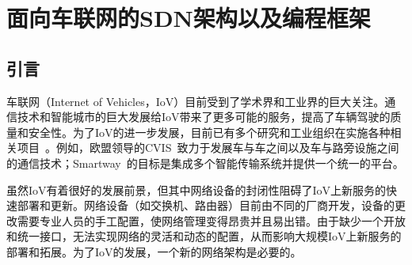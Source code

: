 \chapter{面向车联网的SDN架构以及编程框架}
\section{引言}

车联网（Internet of Vehicles，IoV）目前受到了学术界和工业界的巨大关注。通信技术和智能城市的巨大发展给IoV带来了更多可能的服务，提高了车辆驾驶的质量和安全性。为了IoV的进一步发展，目前已有多个研究和工业组织在实施各种相关项目~\cite{CVIS, makino2005smartway}。例如，欧盟领导的CVIS~\cite{CVIS}致力于发展车与车之间以及车与路旁设施之间的通信技术；Smartway~\cite{makino2005smartway}的目标是集成多个智能传输系统并提供一个统一的平台。


虽然IoV有着很好的发展前景，但其中网络设备的封闭性阻碍了IoV上新服务的快速部署和更新。网络设备（如交换机、路由器）目前由不同的厂商开发，设备的更改需要专业人员的手工配置，使网络管理变得昂贵并且易出错。由于缺少一个开放和统一接口，无法实现网络的灵活和动态的配置，从而影响大规模IoV上新服务的部署和拓展。为了IoV的发展，一个新的网络架构是必要的。


